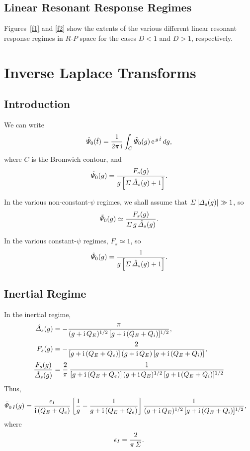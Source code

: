 \documentclass[titlepage=false,12pt]{article}
\begin{document}
\subsection{Linear Resonant Response Regimes}
Figures~\ref{f1} and \ref{f2} show the extents of the various different linear resonant response regimes in $R$-$P$ space for the
cases $D<1$ and $D>1$, respectively. 

\section{Inverse Laplace Transforms}
\subsection{Introduction}
We can write
\begin{equation}
\hat{\mit\Psi}_0(\hat{t}) =\frac{1}{2\pi\,{\rm i}} \int_C\tilde{\mit\Psi}_0(g)\,{\rm e}^{\,g\,\hat{t}}\,dg, 
\end{equation}
where $C$ is the Bromwich contour, and
\begin{equation}
\tilde{\mit\Psi}_0(g)= 
\frac{F_s(g)}{g\left[{\mit\Sigma}\,\hat{\mit\Delta}_s(g)+1\right]}.
\end{equation}

In the various non-constant-$\psi$ regimes, we shall assume that ${\mit\Sigma}\,|{\mit\Delta}_s(g)|\gg 1$, so
\begin{equation}
\tilde{\mit\Psi}_0(g) \simeq \frac{F_s(g)}{{\mit\Sigma}\,g\,\hat{\mit\Delta}_s(g)}.
\end{equation}

In the various constant-$\psi$ regimes, $F_s\simeq 1$, so
\begin{equation}
\tilde{\mit\Psi}_0(g)= 
\frac{1}{g\left[{\mit\Sigma}\,\hat{\mit\Delta}_s(g)+1\right]}.
\end{equation}

\subsection{Inertial Regime}
In the inertial regime,
\begin{align}
\hat{\mit\Delta}_s(g) &= -\frac{\pi}{(g+{\rm i}\,Q_E)^{1/2}\,[g + {\rm i}\,(Q_E+Q_i)]^{1/2}},\\[0.5ex]
F_s(g) &= - \frac{2}{[g+{\rm i}\,(Q_E+Q_e)]\,(g+{\rm i}\,Q_E)\,[g + {\rm i}\,(Q_E+Q_i)]},\\[0.5ex]
\frac{F_s(g)}{\hat{\mit\Delta}_s(g)}&=\frac{2}{\pi}\, \frac{1}{[g+{\rm i}\,(Q_E+Q_e)]\,(g+{\rm i}\,Q_E)^{1/2}\,[g + {\rm i}\,(Q_E+Q_i)]^{1/2}}
\end{align}
Thus,
\begin{align}
\tilde{\mit\Psi}_{0\,I}(g) &= \frac{\epsilon_I}{{\rm i}\,(Q_E+Q_e)}\left[
\frac{1}{g}- \frac{1}{g+ {\rm i}\,(Q_E+Q_e)}\right]
\frac{1}{(g+{\rm i}\,Q_E)^{1/2}\,[g + {\rm i}\,(Q_E+Q_i)]^{1/2}},
\end{align}
where 
\begin{align}
\epsilon_I = \frac{2}{\pi\,{\mit\Sigma}}.
\end{align}
\end{document}
